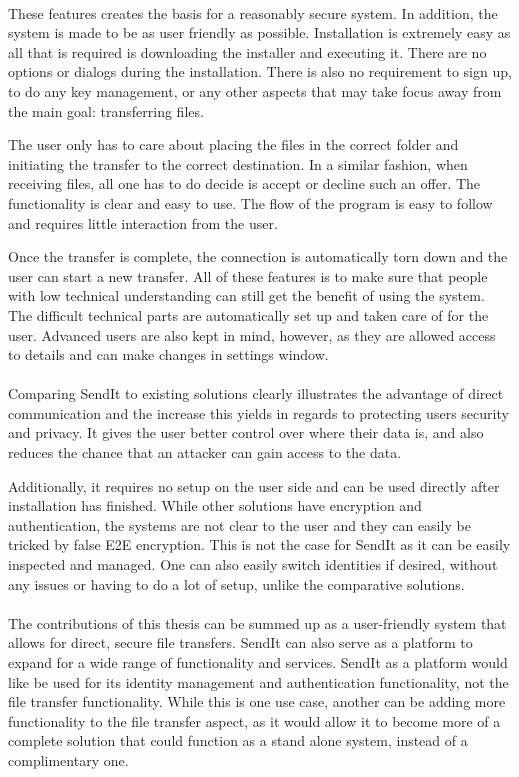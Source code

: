 \paragraph{}
%
These features creates the basis for a reasonably secure system. In addition, the system is made to be as user friendly as possible. Installation is extremely easy as all that is required is downloading the installer and executing it. There are no options or dialogs during the installation. There is also no requirement to sign up, to do any key management, or any other aspects that may take focus away from the main goal: transferring files.

The user only has to care about placing the files in the correct folder and initiating the transfer to the correct destination. In a similar fashion, when receiving files, all one has to do decide is accept or decline such an offer. The functionality is clear and easy to use. The flow of the program is easy to follow and requires little interaction from the user.

Once the transfer is complete, the connection is automatically torn down and the user can start a new transfer. All of these features is to make sure that people with low technical understanding can still get the benefit of using the system. The difficult technical parts are automatically set up and taken care of for the user. Advanced users are also kept in mind, however, as they are allowed access to details and can make changes in settings window.
%
\paragraph{}
%
Comparing SendIt to existing solutions clearly illustrates the advantage of direct communication and the increase this yields in regards to protecting users security and privacy. It gives the user better control over where their data is, and also reduces the chance that an attacker can gain access to the data.

Additionally, it requires no setup on the user side and can be used directly after installation has finished. While other solutions have encryption and authentication, the systems are not clear to the user and they can easily be tricked by false E2E encryption. This is not the case for SendIt as it can be easily inspected and managed. One can also easily switch identities if desired, without any issues or having to do a lot of setup, unlike the comparative solutions.
%
\paragraph{}
%
The contributions of this thesis can be summed up as a user-friendly system that allows for direct, secure file transfers. SendIt can also serve as a platform to expand for a wide range of functionality and services. SendIt as a platform would like be used for its identity management and authentication functionality, not the file transfer functionality. While this is one use case, another can be adding more functionality to the file transfer aspect, as it would allow it to become more of a complete solution that could function as a stand alone system, instead of a complimentary one.

